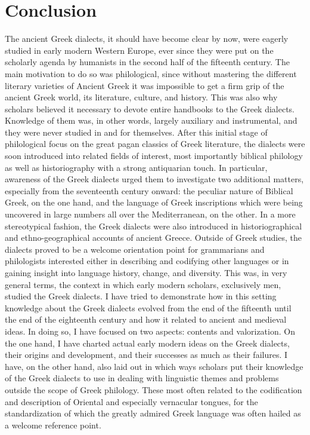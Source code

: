 \chapter{Conclusion} \label{chap:9}

The ancient Greek dialects, it should have become clear by now, were eagerly studied in early modern Western Europe, ever since they were put on the scholarly agenda by humanists in the second half of the fifteenth century. The main motivation to do so was philological, since without mastering the different literary varieties of Ancient Greek it was impossible to get a firm grip of the ancient Greek world, its literature, culture, and history. This was also why scholars believed it necessary to devote entire handbooks to the Greek dialects. Knowledge of them was, in other words, largely auxiliary and instrumental, and they were never studied in and for themselves. After this initial stage of philological focus on the great pagan classics of Greek literature, the dialects were soon introduced into related fields of interest, most importantly biblical philology as well as historiography with a strong antiquarian touch. In particular, awareness of the Greek dialects urged them to investigate two additional matters, especially from the seventeenth century onward: the peculiar nature of Biblical Greek, on the one hand, and the language of Greek inscriptions which were being uncovered in large numbers all over the Mediterranean, on the other. In a more stereotypical fashion, the Greek dialects were also introduced in historiographical and ethno-geographical accounts of ancient Greece. Outside of Greek studies, the dialects proved to be a welcome orientation point for grammarians and philologists interested either in describing and codifying other languages or in gaining insight into language history, change, and diversity. This was, in very general terms, the context in which early modern scholars, exclusively men, studied the Greek dialects. I have tried to demonstrate how in this setting knowledge about the Greek dialects evolved from the end of the fifteenth until the end of the eighteenth century and how it related to ancient and medieval ideas. In doing so, I have focused on two aspects: contents and valorization. On the one hand, I have charted actual early modern ideas on the Greek dialects, their origins and development, and their successes as much as their failures. I have, on the other hand, also laid out in which ways scholars put their knowledge of the Greek dialects to use in dealing with linguistic themes and problems outside the scope of Greek philology. These most often related to the codification and description of Oriental and especially vernacular tongues, for the standardization of which the greatly admired Greek language was often hailed as a welcome reference point.

